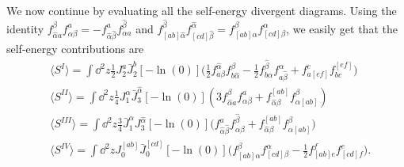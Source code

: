 \documentclass[12pt]{article}
\def\be{\begin{equation}}
\def\ee{\end{equation}}
\numberwithin{equation}{section}
\newcommand{\h}[1]{\hat{#1}}
\begin{document}
We now continue by evaluating all the self-energy divergent diagrams. Using the identity $f_{\h{\alpha}a}^\beta f^a_{\alpha \beta} = -f^a_{\hat{\alpha}\h{\beta}} f^{\h{\beta}}_{\alpha a}$ and $f_{[ab]\h{\alpha}}^{\h{\beta}} f_{[cd]\h{\beta}}^{\h{\alpha}} = f_{[ab]\alpha}^\beta f_{[cd]\beta}^\alpha$, we easily get that the self-energy contributions are
\be
\begin{aligned}
&\langle S^I \rangle = \int \dd^2z \frac{1}{2} J_2^a \bar{J}_2^b [-\ln(0)]\big( \frac{1}{2} f_{a\beta}^{\h{\alpha}} f^\beta_{b\h{\alpha}} - \frac{1}{2} f^{\h{\beta}}_{b\alpha} f^{\alpha}_{a\h{\beta}} + f^c_{a[ef]} f^{[ef]}_{bc}\big) \\
&\langle S^{II} \rangle = \int \dd^2z \frac{1}{4}J_1^\alpha\bar{J}_3^{\h{\alpha}}[-\ln(0)] (3 f^\beta_{\h{\alpha}a} f^a_{\alpha \beta} +  f^{[ab]}_{\h{\alpha}\beta} f_{\alpha [ab]}^\beta) \\
&\langle S^{III} \rangle =  \int \dd^2z \frac{3}{4} \bar{J}_1^\alpha J_3^{\h{\alpha}}[-\ln(0)]\big( f^a_{\h{\alpha}\h{\beta}} f^{\h{\beta}}_{\alpha \beta} + f_{\h{\alpha}\beta}^{[ab]} f_{\alpha [ab]}^\beta\big) \\
&\langle S^{IV} \rangle =  \int \dd^2z J_0^{[ab]} \bar{J}_0^{[cd]} [-\ln(0)]\big(f_{[ab]\alpha}^\beta f^\alpha_{[cd] \beta} -\frac{1}{2} f_{[ab] e}^f f^e_{[cd] f} \big).
\end{aligned}
\ee
\end{document}
